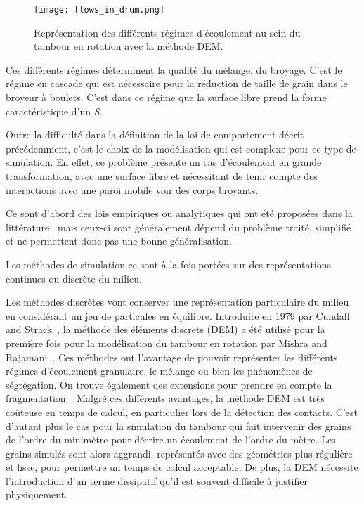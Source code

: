 \begin{figure}
    \texttt{[image: flows\_in\_drum.png]}
    \caption{Représentation des différents régimes d'écoulement au sein du tambour en rotation avec la méthode DEM.}
\end{figure}

Ces différents régimes déterminent la qualité du mélange, du broyage. C'est le régime en cascade qui est nécessaire pour la réduction de taille de grain dans le broyeur à boulets. C'est dans ce régime que la surface libre prend la forme caractéristique d'un \textit{S}.

Outre la difficulté dans la définition de la loi de comportement décrit précédemment, c'est le choix de la modélisation qui est complexe pour ce type de simulation. En effet, ce problème présente un cas d'écoulement en grande transformation, avec une surface libre et nécessitant de tenir compte des interactions avec une paroi mobile voir des corps broyants.

Ce sont d'abord des lois empiriques ou analytiques qui ont été proposées dans la littérature~\cite{Ding2001,Boateng1998,Nicholas2001} mais ceux-ci sont généralement dépend du problème traité, simplifié et ne permettent donc pas une bonne généralisation.

Les méthodes de simulation ce sont à la fois portées sur des représentations continues ou discrète du milieu.

Les méthodes discrètes vont conserver une représentation particulaire du milieu en considérant un jeu de particules en équilibre. Introduite en 1979 par Cundall and Strack~\cite{cundall_discrete_1979}, la méthode des éléments discrets (DEM) a été utilisé pour la première fois pour la modélisation du tambour en rotation par Mishra and Rajamani~\cite{Mishra1992}. Ces méthodes ont l'avantage de pouvoir représenter les différents régimes d'écoulement granulaire, le mélange ou bien les phénomènes de ségrégation. On trouve également des extensions pour prendre en compte la fragmentation~\cite{orozco:hal-02409236}. Malgré ces différents avantages, la méthode DEM est très coûteuse en temps de calcul, en particulier lors de la détection des contacts. C'est d'autant plus le cas pour la simulation du tambour qui fait intervenir des grains de l'ordre du minimètre pour décrire un écoulement de l'ordre du mètre. Les grains simulés sont alors aggrandi, représentés avec des géométries plus régulière et lisse, pour permettre un temps de calcul acceptable.
De plus, la DEM nécessite l'introduction d'un terme dissipatif qu'il est souvent difficile à justifier physiquement.

